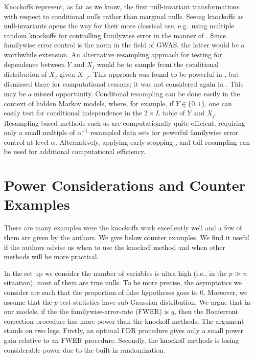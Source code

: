 \documentclass[article,lineno]{biometrika}
\begin{document}
	Knockoffs represent, as far as we know, the first null-invariant transformations with respect to conditional nulls rather than marginal nulls.
	Seeing knockoffs as null-invariants opens the way for their more classical use, e.g.\ using multiple random knockoffs for controlling familywise error in the manner of \cite{Westfall1993}. Since familywise error control is the norm in the field of GWAS, the latter would be a worthwhile extension. An alternative resampling approach for testing for dependence between $Y$ and $X_j$ would be to sample from the conditional distribution of $X_j$ given $X_{-j}$. This approach was found to be powerful in \cite{CandesPanninggoldmodelX2018}, but dismissed there for computational reasons; it was not considered again in \cite{SesiaGenehuntinghidden}. This may be a missed opportunity. 
	Conditonal resampling can be done easily in the context of hidden Markov models, where, for example, if $Y\in \{0,1\}$, one can easily test for conditional independence in the $2\times L$ table of $Y$ and $X_j$. Resampling-based methods such as \cite{Westfall1993} are computationally quite efficient, requiring only a small multiple of $\alpha^{-1}$ resampled data sets for powerful familywise error control at level $\alpha$. Alternatively, applying early stopping \citep[e.g.][]{jiang2012statistical}, and tail resampling \cite[e.g.][]{yu2011efficient} can be used for additional computational efficiency.
	
	
	
	
	
	
	
	
	
	
	
	\section{Power Considerations and Counter Examples}
	
	There are many examples were the knockoffs work excellently well and a few of them are given by the authors. We give below counter examples. We find it  useful if the authors advise us when to use the knockoff method and when other methods will be more practical.
	
	In the set up we consider the number of variables is ultra high (i.e., in the $p\gg n$ situation), most of them are true nulls. To be more precise, the asymptotics we consider are such that 
	the proportion of false hypotheses 
	goes to 0. Moreover, we assume that the $p$ test statistics have sub-Gaussian distribution. We argue that in our models, if the the familywise-error-rate (FWER) is $q$, then  the Bonferroni correction procedure has more power than the knockoff methods. The argument stands on two legs. Firstly, an optimal FDR procedure gives only a small power gain relative to an FWER procedure. Secondly, the knockoff methods is losing considerable power due to the built-in randomization.
	
\end{document}
